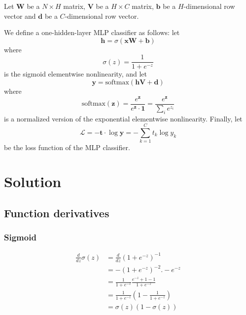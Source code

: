 \documentclass{article}
\begin{document}
Let $\mathbf{W}$ be a $N \times H$ matrix, $\mathbf{V}$ be a $H \times C$
matrix, $\mathbf{b}$ be a $H$-dimensional row vector and $\mathbf{d}$ be a
$C$-dimensional row vector.

We define a one-hidden-layer MLP classifier as follows: let
\begin{equation}
    \mathbf{h} = \sigma(\mathbf{x}\mathbf{W} + \mathbf{b})
\end{equation}
where
\begin{equation}
    \sigma(z) = \frac{1}{1 + e^{-z}}
\end{equation}
is the sigmoid elementwise nonlinearity, and let
\begin{equation}
    \mathbf{y} = \textrm{softmax}(\mathbf{h}\mathbf{V} + \mathbf{d})
\end{equation}
where
\begin{equation}
    \textrm{softmax}(\mathbf{z})
    = \frac{e^{\mathbf{z}}}{e^{\mathbf{z}} \cdot \mathbf{1}}
    = \frac{e^{\mathbf{z}}}{\sum_i e^{z_i}}
\end{equation}
is a normalized version of the exponential elementwise nonlinearity. Finally,
let
\begin{equation}
    \mathcal{L}
    = -\mathbf{t} \cdot \log \mathbf{y}
    = - \sum_{k=1}^C t_k \log y_k
\end{equation}
be the loss function of the MLP classifier.

\section*{Solution}

\subsection*{Function derivatives}

\subsubsection*{Sigmoid}

\begin{equation}
\begin{split}
    \frac{d}{dz}\sigma(z)
    &= \frac{d}{dz}(1 + e^{-z})^{-1} \\
    &= -(1 + e^{-z})^{-2} . -e^{-z} \\
    &= \frac{1}{1 + e^{-z}} \frac{e^{-z} + 1 - 1}{1 + e^{-z}} \\
    &= \frac{1}{1 + e^{-z}} \left(1 - \frac{1}{1 + e^{-z}}\right) \\
    &= \sigma(z)(1 - \sigma(z))
\end{split}
\end{equation}
\end{document}
